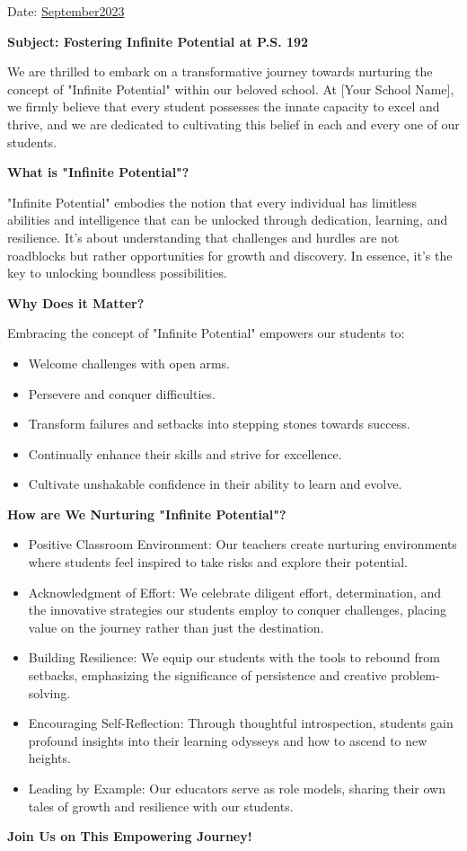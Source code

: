 \documentclass[12pt,letterpaper]{article}
\begin{document}
\vspace*{0.5in}
Date: \href{https://www.ps192.org/apps/bbmessages/show_bbm.jsp?REC_ID=139439}{September2023} 

\textbf{Subject: Fostering Infinite Potential at P.S. 192}

We are thrilled to embark on a transformative journey towards nurturing the concept of "Infinite Potential" within our beloved school. At [Your School Name], we firmly believe that every student possesses the innate capacity to excel and thrive, and we are dedicated to cultivating this belief in each and every one of our students.

\textbf{What is "Infinite Potential"?}

"Infinite Potential" embodies the notion that every individual has limitless abilities and intelligence that can be unlocked through dedication, learning, and resilience. It's about understanding that challenges and hurdles are not roadblocks but rather opportunities for growth and discovery. In essence, it's the key to unlocking boundless possibilities.

\textbf{Why Does it Matter?}

Embracing the concept of "Infinite Potential" empowers our students to:
\begin{itemize}
	\item Welcome challenges with open arms.
    \item Persevere and conquer difficulties.
    \item Transform failures and setbacks into stepping stones towards success.
    \item Continually enhance their skills and strive for excellence.
    \item Cultivate unshakable confidence in their ability to learn and evolve.
\end{itemize}
\textbf{How are We Nurturing "Infinite Potential"?}
\begin{itemize}
	\item Positive Classroom Environment: Our teachers create nurturing environments where students feel inspired to take risks and explore their potential.
	\item Acknowledgment of Effort: We celebrate diligent effort, determination, and the innovative strategies our students employ to conquer challenges, placing value on the journey rather than just the destination.
	\item Building Resilience: We equip our students with the tools to rebound from setbacks, emphasizing the significance of persistence and creative problem-solving.
\pagebreak
\vspace*{1.5cm}
	\item Encouraging Self-Reflection: Through thoughtful introspection, students gain profound insights into their learning odysseys and how to ascend to new heights.
	\item Leading by Example: Our educators serve as role models, sharing their own tales of growth and resilience with our students.
\end{itemize}
\textbf{Join Us on This Empowering Journey!}
\end{document}
